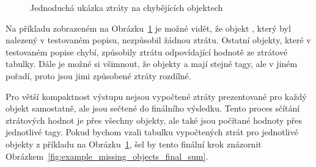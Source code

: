 \begin{figure}[H]
	\caption{Jednoduchá ukázka ztráty na chybějících objektech}\label{fig:example_missing_objects}
\end{figure}

Na příkladu zobrazeném na Obrázku~\ref{fig:example_missing_objects} je možné vidět, že objekt \emph{\objfour},
který byl nalezený v testovaném popisu, nezpůsobil žádnou ztrátu.
Ostatní objekty, které v testovaném popise chybí, způsobily ztrátu odpovídající hodnotě ze ztrátové tabulky.
Dále je možné si všimnout, že objekty \emph{\objsix} a \emph{\objseven} mají stejné tagy, ale v jiném pořadí, proto jsou jimi způsobené ztráty rozdílné.

Pro větší kompaktnost výstupu nejsou vypočtené ztráty prezentované pro každý objekt samostatně, ale jsou sečtené do finálního výsledku.
Tento proces sčítání ztrátových hodnot je přes všechny objekty, ale také jsou počítané hodnoty přes jednotlivé tagy.
Pokud bychom vzali tabulku vypočtených ztrát pro jednotlivé objekty z příkladu na Obrázku~\ref{fig:example_missing_objects},
šel by tento finální krok znázornit Obrázkem~\ref{fig:example_missing_objects_final_sum}.

